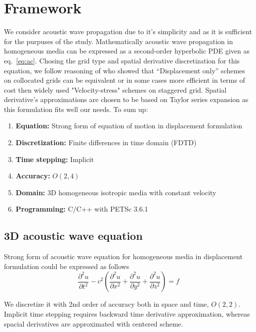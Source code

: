 \documentclass[12pt,a4paper]{report}
\begin{document}
\section*{Framework}
We consider acoustic wave propagation due to it's simplicity and as it is sufficient for the purpuses of the study. Mathematically acoustic wave propagation in homogeneous media can be expressed as a second-order hyperbolic PDE given as eq.~\ref{eq:ac}. Chosing the grid type and spatial derivative discretization for this equation, we follow reasoning of \cite{geller2005comparison} who showed that “Displacement only” schemes on collocated grids can be equivalent or in some cases more efficient in terms of cost then widely used "Velocity-stress" schemes on staggered grid. Spatial derivative's approximations are chosen to be based on Taylor series expansion as this formulation fits well our needs. To sum up:
\begin{enumerate}
\item[] \textbf{Equation:} Strong form of equation of motion in displacement formulation
\item[] \textbf{Discretization:} Finite differences in time domain (FDTD)
\item[] \textbf{Time stepping:} Implicit
\item[] \textbf{Accuracy:} $O\left(2,4\right)$
\item[] \textbf{Domain:} 3D homogeneous isotropic media with constant velocity
\item[] \textbf{Programming:} C/C++ with PETSc 3.6.1\\
\end{enumerate} 

\subsection*{3D acoustic wave equation}
Strong form of acoustic wave equation for homogeneous media in displacement formulation could be expressed as follows
\begin{equation}
\frac{\partial^2 u}{\partial t^2} - c^2 \left(\frac{\partial^2 u}{\partial x^2} + \frac{\partial^2 u}{\partial y^2} + \frac{\partial^2 u}{\partial z^2}\right) = f
\label{eq:ac}
\end{equation}

We discretize it with 2nd order of accuracy both in space and time, $O\left(2,2\right)$. Implicit time stepping requires backward time derivative approximation, whereas spacial derivatives are approximated with centered scheme.
\end{document}
